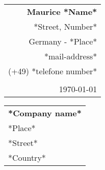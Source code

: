 \documentclass[a4paper, 12pt]{article}
\begin{document}

\thispagestyle{empty}

\begin{flushright}
    \begin{tabular}{r}
        \textbf{Maurice *Name*}
        \\
        \**Street, Number*
        \\
        Germany - *Place*
        \\
        \**mail-address*
        \\
        (+49) *telefone number*
        \\
        \\
        \today
    \end{tabular}
\end{flushright}


\begin{adjustwidth}{-2mm}{}
\begin{flushleft}
    \begin{tabular}{l}
        \textbf{*Company name*}
        \\
        \**Place*
        \\
        \**Street*
        \\
        \**Country*
    \end{tabular}
\end{flushleft}
\end{adjustwidth}

\begin{verbatim}




\end{verbatim}
\end{document}
